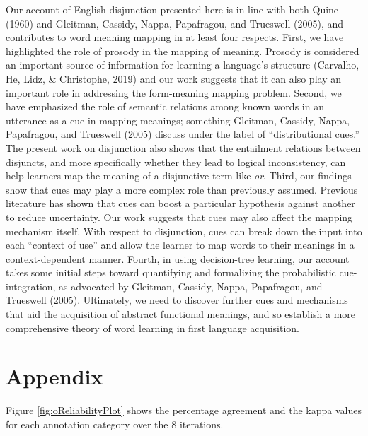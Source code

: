 \documentclass[
  english,
  ,man,floatsintext]{apa6}
\begin{document}
Our account of English disjunction presented here is in line with both Quine (1960) and Gleitman, Cassidy, Nappa, Papafragou, and Trueswell (2005), and contributes to word meaning mapping in at least four respects. First, we have highlighted the role of prosody in the mapping of meaning. Prosody is considered an important source of information for learning a language's structure (Carvalho, He, Lidz, \& Christophe, 2019) and our work suggests that it can also play an important role in addressing the form-meaning mapping problem. Second, we have emphasized the role of semantic relations among known words in an utterance as a cue in mapping meanings; something Gleitman, Cassidy, Nappa, Papafragou, and Trueswell (2005) discuss under the label of ``distributional cues.'' The present work on disjunction also shows that the entailment relations between disjuncts, and more specifically whether they lead to logical inconsistency, can help learners map the meaning of a disjunctive term like \emph{or}. Third, our findings show that cues may play a more complex role than previously assumed. Previous literature has shown that cues can boost a particular hypothesis against another to reduce uncertainty. Our work suggests that cues may also affect the mapping mechanism itself. With respect to disjunction, cues can break down the input into each ``context of use'' and allow the learner to map words to their meanings in a context-dependent manner. Fourth, in using decision-tree learning, our account takes some initial steps toward quantifying and formalizing the probabilistic cue-integration, as advocated by Gleitman, Cassidy, Nappa, Papafragou, and Trueswell (2005). Ultimately, we need to discover further cues and mechanisms that aid the acquisition of abstract functional meanings, and so establish a more comprehensive theory of word learning in first language acquisition.

\hypertarget{appendix}{%
\section{Appendix}\label{appendix}}

Figure \ref{fig:oReliabilityPlot} shows the percentage agreement and the kappa values for each annotation category over the 8 iterations.
\end{document}
